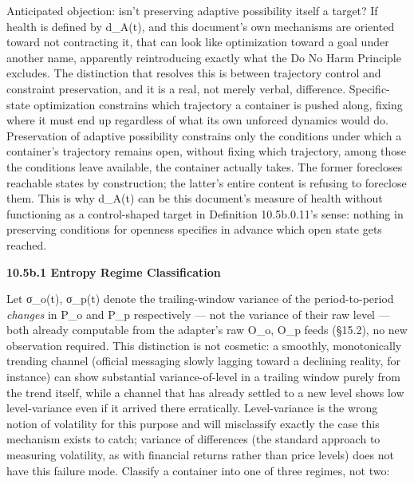 \documentclass[
]{article}
\begin{document}
Anticipated objection: isn't preserving adaptive possibility itself a
target? If health is defined by d\_A(t), and this document's own
mechanisms are oriented toward not contracting it, that can look like
optimization toward a goal under another name, apparently reintroducing
exactly what the Do No Harm Principle excludes. The distinction that
resolves this is between trajectory control and constraint preservation,
and it is a real, not merely verbal, difference. Specific-state
optimization constrains which trajectory a container is pushed along,
fixing where it must end up regardless of what its own unforced dynamics
would do. Preservation of adaptive possibility constrains only the
conditions under which a container's trajectory remains open, without
fixing which trajectory, among those the conditions leave available, the
container actually takes. The former forecloses reachable states by
construction; the latter's entire content is refusing to foreclose them.
This is why d\_A(t) can be this document's measure of health without
functioning as a control-shaped target in Definition 10.5b.0.11's sense:
nothing in preserving conditions for openness specifies in advance which
open state gets reached.

\textbf{10.5b.1 Entropy Regime Classification}

Let σ\_o(t), σ\_p(t) denote the trailing-window variance of the
period-to-period \emph{changes} in P\_o and P\_p respectively --- not
the variance of their raw level --- both already computable from the
adapter's raw O\_o, O\_p feeds (§15.2), no new observation required.
This distinction is not cosmetic: a smoothly, monotonically trending
channel (official messaging slowly lagging toward a declining reality,
for instance) can show substantial variance-of-level in a trailing
window purely from the trend itself, while a channel that has already
settled to a new level shows low level-variance even if it arrived there
erratically. Level-variance is the wrong notion of volatility for this
purpose and will misclassify exactly the case this mechanism exists to
catch; variance of differences (the standard approach to measuring
volatility, as with financial returns rather than price levels) does not
have this failure mode. Classify a container into one of three regimes,
not two:
\end{document}
